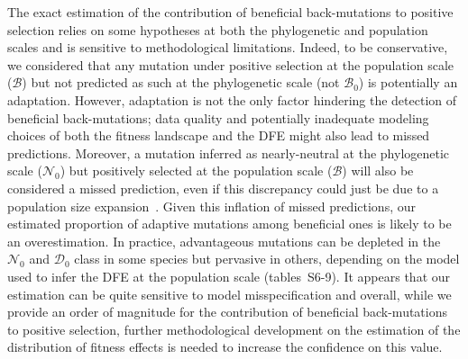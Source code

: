 \documentclass{article}
\newcommand{\SphyDel}{\mathcal{D}_0}
\newcommand{\SphyNeu}{\mathcal{N}_0}
\newcommand{\SphyBen}{\mathcal{B}_0}
\newcommand{\SpopBen}{\mathcal{B}}
\begin{document}
    The exact estimation of the contribution of beneficial back-mutations to positive selection relies on some hypotheses at both the phylogenetic and population scales and is sensitive to methodological limitations.
    Indeed, to be conservative, we considered that any mutation under positive selection at the population scale ($\SpopBen$) but not predicted as such at the phylogenetic scale (not $\SphyBen$) is potentially an adaptation.
    However, adaptation is not the only factor hindering the detection of beneficial back-mutations; data quality and potentially inadequate modeling choices of both the fitness landscape and the DFE might also lead to missed predictions.
    Moreover, a mutation inferred as nearly-neutral at the phylogenetic scale ($\SphyNeu$) but positively selected at the population scale ($\SpopBen$) will also be considered a missed prediction, even if this discrepancy could just be due to a population size expansion~\cite{lanfear_population_2014, jones_shifting_2017, platt_protein_2018}.
    Given this inflation of missed predictions, our estimated proportion of adaptive mutations among beneficial ones is likely to be an overestimation.
    In practice, advantageous mutations can be depleted in the $\SphyNeu$ and $\SphyDel$ class in some species but pervasive in others, depending on the model used to infer the DFE at the population scale (tables~S6-9).
    It appears that our estimation can be quite sensitive to model misspecification and overall, while we provide an order of magnitude for the contribution of beneficial back-mutations to positive selection, further methodological development on the estimation of the distribution of fitness effects is needed to increase the confidence on this value.
\end{document}
